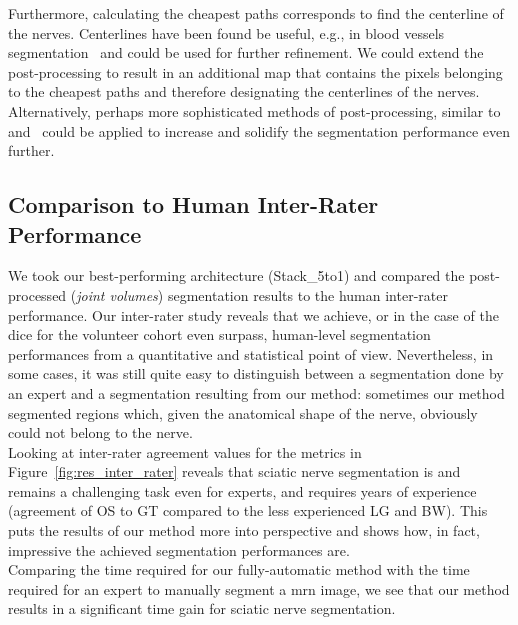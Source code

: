 Furthermore, calculating the cheapest paths corresponds to find the centerline of the nerves. Centerlines have been found be useful, e.g., in blood vessels segmentation~\cite{Lesage2009ASchemes} and could be used for further refinement. We could extend the post-processing to result in an additional map that contains the pixels belonging to the cheapest paths and therefore designating the centerlines of the nerves.\\
Alternatively, perhaps more sophisticated methods of post-processing, similar to~\cite{Rempfler2015ReconstructingProgramming} and~\cite{Selvan2018ExtractionNetworks} could be applied to increase and solidify the segmentation performance even further. 

\subsection{Comparison to Human Inter-Rater Performance}
We took our best-performing architecture (Stack\_5to1) and compared the post-processed (\textit{joint volumes}) segmentation results to the human inter-rater performance. Our inter-rater study reveals that we achieve, or in the case of the \acrlong{dice} for the volunteer cohort even surpass, human-level segmentation performances from a quantitative and statistical point of view. Nevertheless, in some cases, it was still quite easy to distinguish between a segmentation done by an expert and a segmentation resulting from our method: sometimes our method segmented regions which, given the anatomical shape of the nerve, obviously could not belong to the nerve.\\
Looking at inter-rater agreement values for the metrics in Figure~\ref{fig:res_inter_rater} reveals that sciatic nerve segmentation is and remains a challenging task even for experts, and requires years of experience (agreement of OS to GT compared to the less experienced LG and BW). This puts the results of our method more into perspective and shows how, in fact, impressive the achieved segmentation performances are.\\
Comparing the time required for our fully-automatic method with the time required for an expert to manually segment a \gls{mrn} image, we see that our method results in a significant time gain for sciatic nerve segmentation.\\



